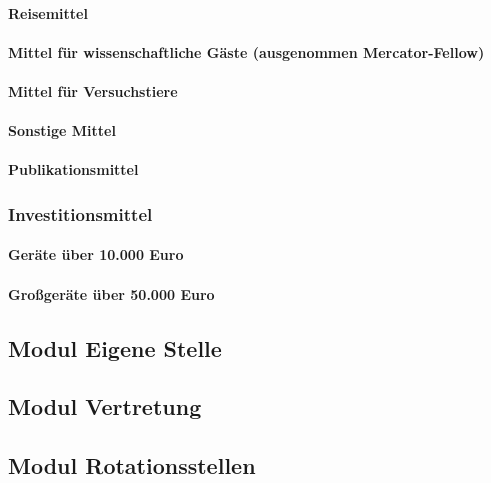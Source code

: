 \documentclass[de]{dfg-proposal}
\begin{document}
                \paragraph{Reisemittel}

                \paragraph{Mittel für wissenschaftliche Gäste (ausgenommen Mercator-Fellow)}

                \paragraph{Mittel für Versuchstiere}

                \paragraph{Sonstige Mittel}

                \paragraph{Publikationsmittel}

            \subsubsection{Investitionsmittel}

                \paragraph{Geräte über 10.000 Euro}

                \paragraph{Großgeräte über 50.000 Euro}

        \subsection{Modul Eigene Stelle}

        \subsection{Modul Vertretung}

        \subsection{Modul Rotationsstellen}
\end{document}
